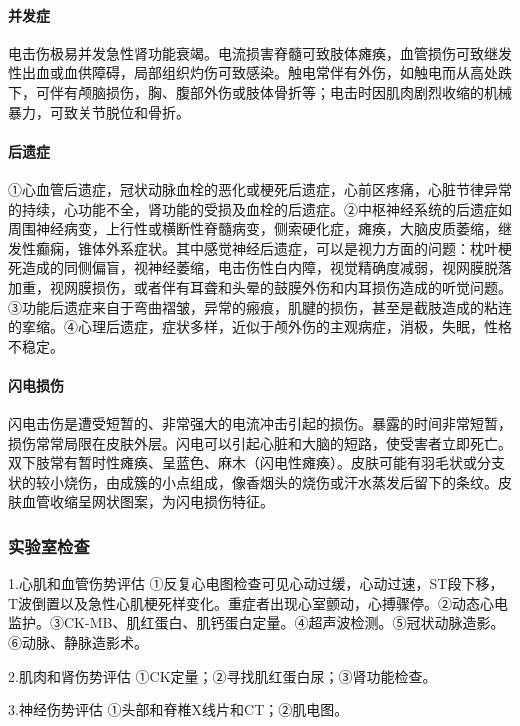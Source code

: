 \paragraph{并发症}

电击伤极易并发急性肾功能衰竭。电流损害脊髓可致肢体瘫痪，血管损伤可致继发性出血或血供障碍，局部组织灼伤可致感染。触电常伴有外伤，如触电而从高处跌下，可伴有颅脑损伤，胸、腹部外伤或肢体骨折等；电击时因肌肉剧烈收缩的机械暴力，可致关节脱位和骨折。

\paragraph{后遗症}

①心血管后遗症，冠状动脉血栓的恶化或梗死后遗症，心前区疼痛，心脏节律异常的持续，心功能不全，肾功能的受损及血栓的后遗症。②中枢神经系统的后遗症如周围神经病变，上行性或横断性脊髓病变，侧索硬化症，瘫痪，大脑皮质萎缩，继发性癫痫，锥体外系症状。其中感觉神经后遗症，可以是视力方面的问题：枕叶梗死造成的同侧偏盲，视神经萎缩，电击伤性白内障，视觉精确度减弱，视网膜脱落加重，视网膜损伤，或者伴有耳聋和头晕的鼓膜外伤和内耳损伤造成的听觉问题。③功能后遗症来自于弯曲褶皱，异常的瘢痕，肌腱的损伤，甚至是截肢造成的粘连的挛缩。④心理后遗症，症状多样，近似于颅外伤的主观病症，消极，失眠，性格不稳定。

\paragraph{闪电损伤}

闪电击伤是遭受短暂的、非常强大的电流冲击引起的损伤。暴露的时间非常短暂，损伤常常局限在皮肤外层。闪电可以引起心脏和大脑的短路，使受害者立即死亡。双下肢常有暂时性瘫痪、呈蓝色、麻木（闪电性瘫痪）。皮肤可能有羽毛状或分支状的较小烧伤，由成簇的小点组成，像香烟头的烧伤或汗水蒸发后留下的条纹。皮肤血管收缩呈网状图案，为闪电损伤特征。

\subsubsection{实验室检查}

1.心肌和血管伤势评估
①反复心电图检查可见心动过缓，心动过速，ST段下移，T波倒置以及急性心肌梗死样变化。重症者出现心室颤动，心搏骤停。②动态心电监护。③CK-MB、肌红蛋白、肌钙蛋白定量。④超声波检测。⑤冠状动脉造影。⑥动脉、静脉造影术。

2.肌肉和肾伤势评估 ①CK定量；②寻找肌红蛋白尿；③肾功能检查。

3.神经伤势评估 ①头部和脊椎X线片和CT；②肌电图。

